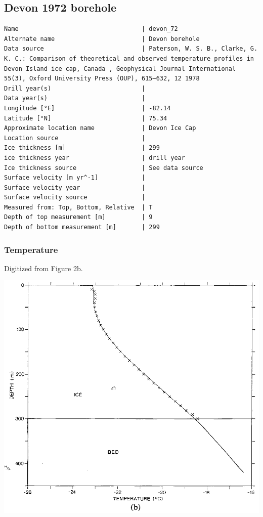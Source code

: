 \documentclass[article,a4paper,times,11pt,twoside]{article}
\begin{document}
\subsection{Devon 1972 borehole}
\label{sec:org15ddc24}
\begin{verbatim}
Name                                  | devon_72
Alternate name                        | Devon borehole
Data source                           | Paterson, W. S. B., Clarke, G. K. C.: Comparison of theoretical and observed temperature profiles in Devon Island ice cap, Canada , Geophysical Journal International 55(3), Oxford University Press (OUP), 615–632, 12 1978 
Drill year(s)                         | 
Data year(s)                          | 
Longitude [°E]                        | -82.14
Latitude [°N]                         | 75.34
Approximate location name             | Devon Ice Cap
Location source                       | 
Ice thickness [m]                     | 299
ice thickness year                    | drill year
Ice thickness source                  | See data source
Surface velocity [m yr^-1]            | 
Surface velocity year                 | 
Surface velocity source               | 
Measured from: Top, Bottom, Relative  | T
Depth of top measurement [m]          | 9
Depth of bottom measurement [m]       | 299
\end{verbatim}


\subsubsection{Temperature}
\label{sec:org1589a66}

Digitized from \textcite{paterson_1978} Figure 2b.

\begin{center}
\includegraphics[width=.9\linewidth]{devon_72/paterson_1978_fig2b.png}
\end{center}
\end{document}
